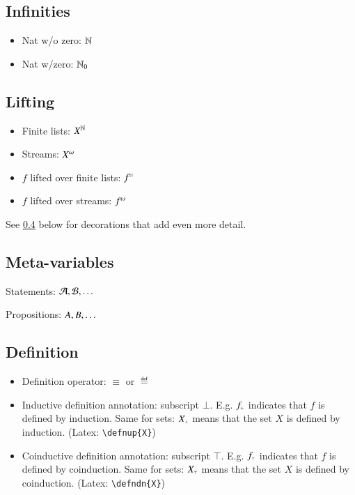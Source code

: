 
\subsection{Infinities}

\begin{itemize}
\item Nat w/o zero: \(\mathbb{N}\)
\item Nat w/zero: \(\mathbb{N}_0\)
\end{itemize}

\subsection{Lifting}

\begin{itemize}
\item Finite lists: \(X^{\mathbb{N}}\)
\item Streams: \(X^{\omega}\)
\item \(f\) lifted over finite lists: \(f^{\scriptscriptstyle\mathbb{N}}\)
\item \(f\) lifted over streams: \(f^{\omega}\)
\end{itemize}

See \ref{notation:definition} below for decorations that add even more
detail.


\subsection{Meta-variables}

Statements: \(\mathcal{A}, \mathcal{B}, \ldots\)

Propositions: \(A, B, \ldots\)


\subsection{Definition}\label{notation:definition}

\begin{itemize}
\item Definition operator: \(\equiv\) or \(\eqdef\)
\item Inductive definition annotation: subscript
  \(\bot\). E.g. \(f_{\scriptscriptstyle\bot}\) indicates that
  \(f\) is defined by induction. Same for sets: \(X_{\scriptscriptstyle\bot}\) means
  that the set \(X\) is defined by induction. (Latex:
  \texttt{\textbackslash{}defnup\{X\}})
\item Coinductive definition annotation: subscript \(\top\). E.g.
  \(f_{\scriptscriptstyle\top}\) indicates that \(f\) is defined by coinduction. Same
  for sets: \(X_{\scriptscriptstyle\top}\) means that the set \(X\) is defined by
  coinduction. (Latex: \texttt{\textbackslash{}defndn\{X\}})
\end{itemize}

